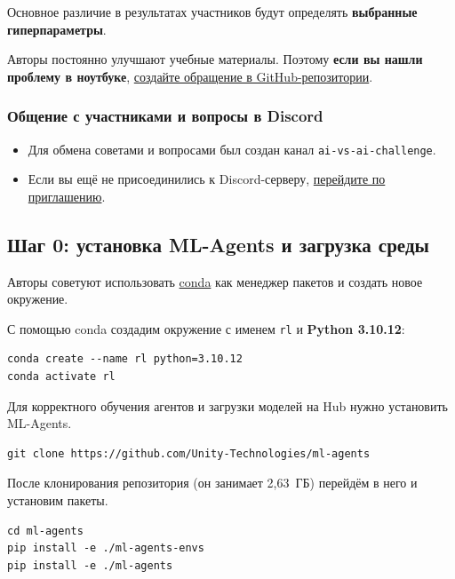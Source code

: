 \documentclass[11pt,a4paper]{article}
\begin{document}
Основное различие в результатах участников будут определять \textbf{выбранные гиперпараметры}.

Авторы постоянно улучшают учебные материалы. Поэтому \textbf{если вы нашли проблему в ноутбуке}, \href{https://github.com/huggingface/deep-rl-class/issues}{создайте обращение в GitHub-репозитории}.

\subsubsection{Общение с участниками и вопросы в Discord}\label{chat-with-your-classmates-share-advice-and-ask-questions-on-discord}

\begin{itemize}
\tightlist
\item
  Для обмена советами и вопросами был создан канал \texttt{ai-vs-ai-challenge}.
\item
  Если вы ещё не присоединились к Discord-серверу, \href{https://discord.gg/ydHrjt3WP5}{перейдите по приглашению}.
\end{itemize}

\subsection{Шаг 0: установка ML-Agents и загрузка среды}\label{step-0-install-mlagents-and-download-the-correct-executable}

Авторы советуют использовать \href{https://docs.conda.io/en/latest/}{conda} как менеджер пакетов и создать новое окружение.

С помощью conda создадим окружение с именем \texttt{rl} и \textbf{Python 3.10.12}:

\begin{lstlisting}
conda create --name rl python=3.10.12
conda activate rl
\end{lstlisting}

Для корректного обучения агентов и загрузки моделей на Hub нужно установить ML-Agents.

\begin{lstlisting}
git clone https://github.com/Unity-Technologies/ml-agents
\end{lstlisting}

После клонирования репозитория (он занимает 2,63~ГБ) перейдём в него и установим пакеты.

\begin{lstlisting}
cd ml-agents
pip install -e ./ml-agents-envs
pip install -e ./ml-agents
\end{lstlisting}
\end{document}

